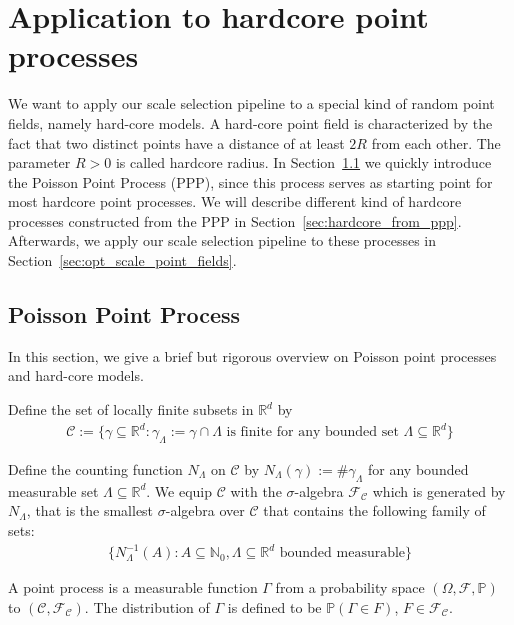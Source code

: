 \chapter{Application to hardcore point processes}

We want to apply our scale selection pipeline to a special kind of random point fields, namely hard-core models. A hard-core point field is characterized by the fact that two distinct points have a distance of at least $2R$ from each other. The parameter $R>0$ is called hardcore radius. In Section~\ref{sec:PPP} we quickly introduce the Poisson Point Process (PPP), since this process serves as starting point for most hardcore point processes. We will describe different kind of hardcore processes constructed from the PPP in Section~\ref{sec:hardcore_from_ppp}. Afterwards, we apply our scale selection pipeline to these processes in Section~\ref{sec:opt_scale_point_fields}.



\section{Poisson Point Process}\label{sec:PPP}

In this section, we give a brief but rigorous overview on Poisson point processes and hard-core models.

Define the set of locally finite subsets in $\mathbb{R}^d$ by
\begin{align*}
    \mathcal{C}:=\{\gamma\subseteq\mathbb{R}^d:\gamma_{\Lambda}:=\gamma\cap\Lambda\text{ is finite for any bounded set }\Lambda\subseteq\mathbb{R}^d\}
\end{align*}

Define the counting function $N_{\Lambda}$ on $\mathcal{C}$ by $N_{\Lambda}(\gamma):=\#\gamma_{\Lambda}$ for any bounded measurable set $\Lambda\subseteq\mathbb{R}^d$. We equip $\mathcal{C}$ with the $\sigma$-algebra $\mathcal{F}_{\mathcal{C}}$ which is generated by $N_{\Lambda}$, that is the smallest $\sigma$-algebra over $\mathcal{C}$ that contains the following family of sets:
\begin{align*}
    \{N_{\Lambda}^{-1}(A):A\subseteq\mathbb{N}_0,\Lambda\subseteq\mathbb{R}^d\text{ bounded measurable}\}
\end{align*}

A point process is a measurable function $\Gamma$ from a probability space $(\Omega,\mathcal{F},\mathbb{P})$ to $(\mathcal{C},\mathcal{F}_{\mathcal{C}})$. The distribution of $\Gamma$ is defined to be $\mathbb{P}(\Gamma\in F)$, $F\in\mathcal{F}_{\mathcal{C}}$.

